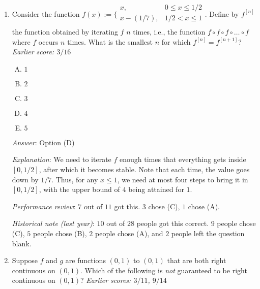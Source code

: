 \documentclass[10pt]{amsart}
\begin{document}
\begin{enumerate}
  {\em Answer}: Option (B)

  {\em Explanation}: Suppose the zeros of $f$ are $a_1 < a_2 < \dots <
  a_{14}$. By Rolle's theorem, there is {\em at least one} zero of
  $f'$ between each $a_i$ and $a_{i+1}$. There may be more, since
  Rolle's theorem gives only a {\em lower} bound. This gives thirteen
  solutions $c$ to $f'(c) = 0$.

  Note that in order to apply Rolle's theorem, it is enough to be
  given that $f$ is differentiable, so the additional hypothesis that
  $f'$ is continuous is not necessary.

  {\em Performance review}: $9$ out of $11$ got this. $2$ chose (A).

  {\em Historical note (last year)}: $19$ out of $28$ people got this
  correct. $5$ people chose (A), $2$ people chose (C), and $1$ person
  each chose (D) and (E).
\item Consider the function $f(x) := \lbrace\begin{array}{rl} x, & 0
  \le x \le 1/2 \\ x - (1/7), & 1/2 < x \le 1 \\\end{array}$. Define by
  $f^{[n]}$ the function obtained by iterating $f$ $n$ times, i.e.,
  the function $f \circ f \circ f \circ \dots \circ f$ where $f$
  occurs $n$ times. What is the smallest $n$ for which $f^{[n]} =
  f^{[n + 1]}$? {\em Earlier score: $3/16$}

  \begin{enumerate}[(A)]
  \item $1$
  \item $2$
  \item $3$
  \item $4$
  \item $5$
  \end{enumerate}

  {\em Answer}: Option (D)

  {\em Explanation}: We need to iterate $f$ enough times that
  everything gets inside $[0,1/2]$, after which it becomes
  stable. Note that each time, the value goes down by $1/7$. Thus, for
  any $x \le 1$, we need at most four steps to bring it in $[0,1/2]$,
  with the upper bound of $4$ being attained for $1$.

  {\em Performance review}: $7$ out of $11$ got this. $3$ chose (C),
  $1$ chose (A).

  {\em Historical note (last year)}: $10$ out of $28$ people got this
  correct. $9$ people chose (C), $5$ people chose (B), $2$ people
  chose (A), and $2$ people left the question blank.
\item Suppose $f$ and $g$ are functions $(0,1)$ to $(0,1)$ that are
  both right continuous on $(0,1)$. Which of the following is {\em
  not} guaranteed to be right continuous on $(0,1)$? {\em Earlier
  scores: $3/11$, $9/14$}


\end{enumerate}
\end{document}

